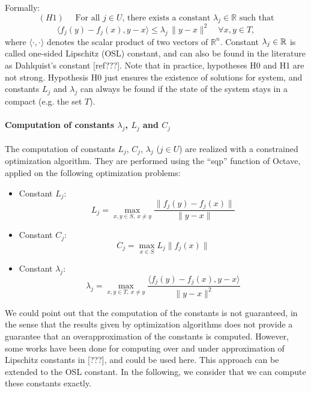 Formally:
%
$$(H1) 
\quad \mbox{ For all $j \in U$, there exists a constant $\lambda_j\in \mathbb{R}$ such that}$$ 
\[
\langle f_j(y)-f_j(x), y-x \rangle \leq \lambda_j\, \|y-x\|^2\quad
\forall x,y\in T,
\]
where $\langle \cdot, \cdot\rangle$ denotes the scalar product of two vectors of $\mathbb{R}^n$.
%
Constant $\lambda_j \in \mathbb{R}$ is called one-sided Lipschitz (OSL) constant, and can also be found in the 
literature as Dahlquist's constant [ref???].
Note that in practice, hypotheses H0 and H1 are not strong. 
Hypothesis H0 just ensures the existence of solutions for system,
and constants $L_j$ and $\lambda_j$ can always be found if the state 
of the system stays in a compact (e.g. the set $T$).
%

\paragraph{Computation of constants $\lambda_j$, $L_j$ and $C_j$}

The computation of constants $L_j$, $C_j$, $\lambda_j$ 
($j\in U$) are realized with
a constrained optimization algorithm.
They are performed using the ``sqp'' function of Octave, applied on the following 
optimization problems:
\begin{itemize}
 \item Constant $L_j$:
 $$ L_j = \max_{{x,y}\in S,\  x\neq y} \frac{\| f_j(y) - f_j(x) \|}{\| y - x \|}  $$
 \item Constant $C_j$:
 $$ C_j = \max_{{x}\in S} L_j \| f_j(x) \|$$
 \item Constant $\lambda_j$:
 $$ \lambda_j = \max_{{x,y}\in T,\  x\neq y} \frac{\langle f_j(y) - f_j(x), y - x \rangle}{\|y - x \|^2 }$$
 \end{itemize}
We could point out that the computation of the constants is not guaranteed, in the 
sense that the results given by optimization algorithms does not 
provide a guarantee that an overapproximation of the constants is computed. However,
some works have been done for computing over and under approximation
of Lipschitz constants in \cite{} [???], and could be used here. This approach can 
be extended to the OSL constant. In the following, we consider that we can 
compute these constants exactly.
 
